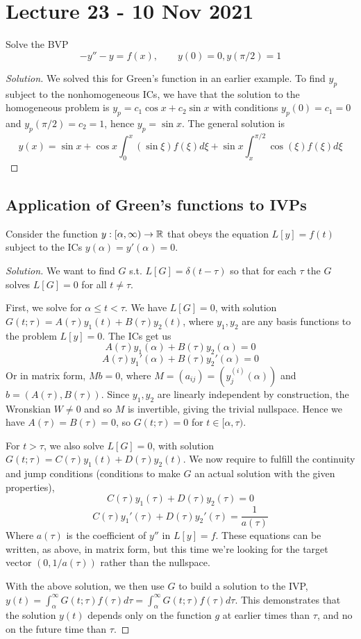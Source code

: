 \section{Lecture 23 - 10 Nov 2021}
\begin{example}
  Solve the BVP
  \[ -y''-y = f(x), \quad\quad y(0)=0, y(\pi/2)=1\]
\end{example}
\begin{proof}[Solution]
  We solved this for Green's function in an earlier example. To find $y_p$ subject to the
  nonhomogeneous ICs, we have that the solution to the homogeneous problem is $y_p=c_1\cos
  x+ c_2\sin x$ with conditions $y_p(0)=c_1=0$and $y_p(\pi/2)=c_2=1$, hence $y_p=\sin x$.
  The general solution is 
  \[y(x)= \sin x + \cos x \int_0^x(\sin \xi)f(\xi) d\xi + \sin x \int_x^{\pi/2}
  \cos(\xi)f(\xi) d\xi\]
\end{proof}

\subsection{Application of Green's functions to IVPs}
\begin{example}
  Consider the function $y:[\alpha,\infty)\to\mathbb R$ that obeys the equation
  $L[y]=f(t)$ subject to the ICs $y(\alpha)=y'(\alpha)=0$.
\end{example}
\begin{proof}[Solution]
  We want to find $G$ s.t. $L[G]=\delta(t-\tau)$ so that for each $\tau$ the $G$ solves
  $L[G]=0$ for all $t\neq \tau$.

  First, we solve for $\alpha\leq t< \tau$. We have $L[G]=0$, with solution
  $G(t;\tau)=A(\tau)y_1(t)+B(\tau)y_2(t)$, where $y_1,y_2$ are any basis functions to the
  problem $L[y]=0$. The ICs get us 
  \[ A(\tau)y_1(\alpha) + B(\tau)y_2(\alpha)=0\]
  \[ A(\tau)y_1'(\alpha) + B(\tau)y_2'(\alpha)=0\]
  Or in matrix form, $Mb=0$, where $M=(a_{ij})=(y_j^{(i)}(\alpha))$ and
  $b=(A(\tau),B(\tau))$. Since $y_1,y_2$ are linearly independent by construction, the
  Wronskian $W\neq 0$ and so $M$ is invertible, giving the trivial nullspace. Hence we
  have $A(\tau)=B(\tau)=0$, so $G(t;\tau)=0$ for $t\in [\alpha,\tau)$.

  For $t>\tau$, we also solve $L[G]=0$, with solution
  $G(t;\tau)=C(\tau)y_1(t)+D(\tau)y_2(t)$. We now require to fulfill the continuity and
  jump conditions (conditions to make $G$ an actual solution with the given properties),
  \[C(\tau)y_1(\tau)+D(\tau)y_2(\tau)=0\]
  \[C(\tau)y_1'(\tau)+D(\tau)y_2'(\tau)=\frac{1}{a(\tau)}\]
  Where $a(\tau)$ is the coefficient of $y''$ in $L[y]=f$. These equations can be written,
  as above, in matrix form, but this time we're looking for the target vector
  $(0,1/a(\tau))$ rather than the nullspace. 
  
  With the above solution, we then use $G$ to build a solution to the IVP,
  $y(t)=\int_{\alpha}^{\infty} G(t;\tau) f(\tau)d\tau = \int_{\alpha}^{\infty}
  G(t;\tau)f(\tau) d\tau$. This demonstrates that the solution $y(t)$ depends only on the
  function $g$ at earlier times than $\tau$, and no on the future time than $\tau$.

\end{proof}

